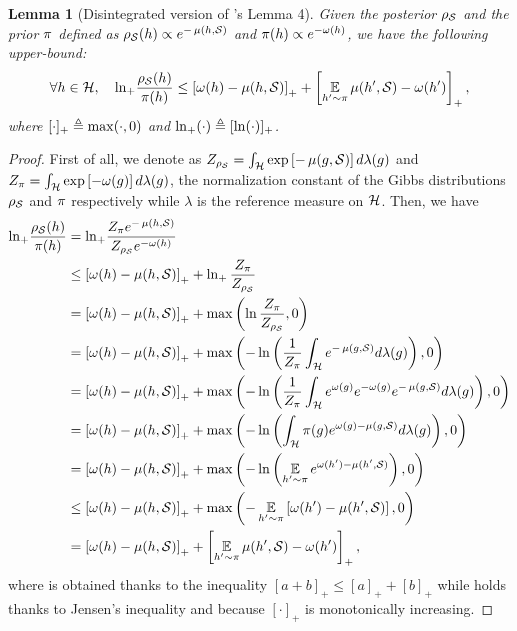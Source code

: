 \documentclass[twoside]{article}
\theoremstyle{plain}
\newtheorem{lemma}[theorem]{Lemma}
\begin{document}
\begin{lemma}[Disintegrated version of \citeauthor{lever2013tighter}'s Lemma 4]\label{lemma:dis-kl-lever}
Given the posterior $\AQ$ and the prior $\P$ defined as $\AQ(h) \propto e^{-\comp(h, \Scal)}$ and $\P(h) \propto e^{-\omega(h)}$, we have the following upper-bound:
\begin{align*}
\forall h\in\Hcal,\quad \ln_{+}\!\frac{\AQ(h)}{\P(h)} \le \LB \omega(h)-\comp(h, \Scal) \RB_{+} +\LB\EE_{h'\sim\P} \comp(h', \Scal)-\omega(h') \RB_{+},
\end{align*}
where $[\cdot]_{+}\defeq\max(\cdot, 0)$ and $\ln_{+}(\cdot) \defeq [\ln(\cdot)]_{+}$.
\end{lemma}
\begin{proof}
First of all, we denote as $Z_{\AQ}=\int_{\Hcal}\exp\left[-\comp(g, \Scal)\right]d\lambda(g)$ and $Z_{\P}=\int_{\Hcal}\exp\left[-\omega(g)\right]d\lambda(g)$, the normalization constant of the Gibbs distributions $\AQ$ and $\P$ respectively while $\lambda$ is the reference measure on $\Hcal$.
Then, we have
\begin{align}
\ln_{+}\!\frac{\AQ(h)}{\P(h)} &= \ln_{+}\!\frac{Z_{\P}e^{-\comp(h, \Scal)}}{Z_{\AQ}e^{-\omega(h)}}\nonumber\\
&\le \LB \omega(h)-\comp(h, \Scal) \RB_{+} + \ln_{+}\frac{Z_{\P}}{Z_{\AQ}}\label{eq:proof-dis-kl-lever-1}\\
&= \LB \omega(h)-\comp(h, \Scal) \RB_{+} + \max\LP \ln\frac{Z_{\P}}{Z_{\AQ}}, 0\RP\nonumber\\
&= \LB \omega(h)-\comp(h, \Scal) \RB_{+} + \max\LP - \ln\LP\frac{1}{Z_{\P}}\int_{\Hcal}e^{-\comp(g, \Scal)}d\lambda(g)\RP, 0\RP\nonumber\\
&= \LB \omega(h)-\comp(h, \Scal) \RB_{+} + \max\LP - \ln\LP\frac{1}{Z_{\P}}\int_{\Hcal}e^{\omega(g)}e^{-\omega(g)}e^{-\comp(g, \Scal)}d\lambda(g)\RP, 0\RP\nonumber\\
&= \LB \omega(h)-\comp(h, \Scal) \RB_{+} + \max\LP - \ln\LP\int_{\Hcal}\P(g)e^{\omega(g)-\comp(g, \Scal)}d\lambda(g)\RP, 0\RP\nonumber\\
&= \LB \omega(h)-\comp(h, \Scal) \RB_{+} + \max\LP - \ln\LP\EE_{h'\sim\P}e^{\omega(h')-\comp(h', \Scal)}\RP, 0\RP\nonumber\\
&\le \LB \omega(h)-\comp(h, \Scal) \RB_{+} + \max\LP - \EE_{h'\sim\P}\LB \omega(h')-\comp(h', \Scal) \RB, 0\RP\label{eq:proof-dis-kl-lever-2}\\
&= \LB \omega(h)-\comp(h, \Scal) \RB_{+} + \LB\EE_{h'\sim\P} \comp(h', \Scal)-\omega(h')\RB_{+},\nonumber
\end{align}
where  is obtained thanks to the inequality $[a{+}b]_{+} \le [a]_{+}{+}[b]_{+}$ while  holds thanks to Jensen's inequality and because $[\cdot]_{+}$ is monotonically increasing.
\end{proof}
\end{document}
